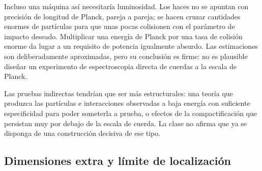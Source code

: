 Incluso una máquina así necesitaría luminosidad. Los haces no se apuntan con precisión de longitud de Planck, pareja a pareja; se hacen cruzar cantidades enormes de partículas para que unas pocas colisionen con el parámetro de impacto deseado. Multiplicar una energía de Planck por una tasa de colisión enorme da lugar a un requisito de potencia igualmente absurdo. Las estimaciones son deliberadamente aproximadas, pero su conclusión es firme: no es plausible diseñar un experimento de espectroscopia directa de cuerdas a la escala de Planck.

Las pruebas indirectas tendrían que ser más estructurales: una teoría que produzca las partículas e interacciones observadas a baja energía con suficiente especificidad para poder someterla a prueba, o efectos de la compactificación que persistan muy por debajo de la escala de cuerda. La clase no afirma que ya se disponga de una construcción decisiva de ese tipo.

\subsection{Dimensiones extra y límite de localización}

\begin{classroomqa}\end{classroomqa}

\begin{classroomqa}\end{classroomqa}

